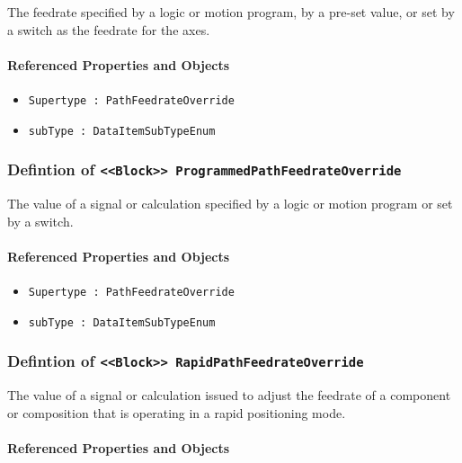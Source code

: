 \FloatBarrier

The feedrate specified by a logic or motion program, by a pre-set value, or set by a switch as the feedrate for the axes. 

\FloatBarrier
\paragraph{Referenced Properties and Objects}

\begin{itemize}
\item \texttt{Supertype : PathFeedrateOverride}

\item \texttt{subType : DataItemSubTypeEnum}

\end{itemize}
\FloatBarrier
\subsubsection{Defintion of \texttt{<<Block>> ProgrammedPathFeedrateOverride}}
  \label{type:ProgrammedPathFeedrateOverride}

\FloatBarrier

The value of a signal or calculation specified by a logic or motion program or set by a switch.

\FloatBarrier
\paragraph{Referenced Properties and Objects}

\begin{itemize}
\item \texttt{Supertype : PathFeedrateOverride}

\item \texttt{subType : DataItemSubTypeEnum}

\end{itemize}
\FloatBarrier
\subsubsection{Defintion of \texttt{<<Block>> RapidPathFeedrateOverride}}
  \label{type:RapidPathFeedrateOverride}

\FloatBarrier

The value of a signal or calculation issued to adjust the feedrate of a component or composition that is operating in a rapid positioning mode.

\FloatBarrier
\paragraph{Referenced Properties and Objects}

